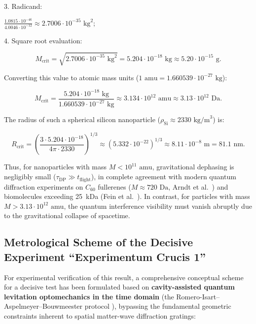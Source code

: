 3. Radicand:

   $\frac{1.0815 \cdot 10^{-46}}{4.0046 \cdot 10^{-12}} \approx 2.7006 \cdot 10^{-35}\text{ kg}^2$;

4. Square root evaluation:

\begin{equation}\label{eq:5.43}\tag{5.43}
M_{\text{crit}} = \sqrt{2.7006 \cdot 10^{-35}\text{ kg}^2} = 5.204 \cdot 10^{-18}\text{ kg} \approx 5.20 \cdot 10^{-15}\text{ g}.
\end{equation}

Converting this value to atomic mass units ($1\text{ amu} = 1.660539 \cdot 10^{-27}\text{ kg}$):

\begin{equation}\label{eq:5.44}\tag{5.44}
M_{\text{crit}} = \frac{5.204 \cdot 10^{-18}\text{ kg}}{1.660539 \cdot 10^{-27}\text{ kg}} \approx 3.134 \cdot 10^{12}\text{ amu} \approx 3.13 \cdot 10^{12}\text{ Da}.
\end{equation}

The radius of such a spherical silicon nanoparticle ($\rho_{\text{Si}} \approx 2330\text{ kg/m}^3$) is:

\begin{equation}\label{eq:5.45}\tag{5.45}
R_{\text{crit}} = \left( \frac{3 \cdot 5.204 \cdot 10^{-18}}{4\pi \cdot 2330} \right)^{1/3} \approx (5.332 \cdot 10^{-22})^{1/3} \approx 8.11 \cdot 10^{-8}\text{ m} = 81.1\text{ nm}.
\end{equation}

Thus, for nanoparticles with mass $M < 10^{11}\text{ amu}$, gravitational dephasing is negligibly small ($\tau_{\text{DP}} \gg t_{\text{flight}}$), in complete agreement with modern quantum diffraction experiments on $C_{60}$ fullerenes ($M \approx 720\text{ Da}$, Arndt et al.~\cite{ref42}) and biomolecules exceeding 25~kDa (Fein et al.~\cite{ref43}). In contrast, for particles with mass $M > 3.13 \cdot 10^{12}\text{ amu}$, the quantum interference visibility must vanish abruptly due to the gravitational collapse of spacetime.

\subsection{Metrological Scheme of the Decisive Experiment ``Experimentum Crucis 1''}\label{sec:5.3}

For experimental verification of this result, a comprehensive conceptual scheme for a decisive test has been formulated based on \textbf{cavity-assisted quantum levitation optomechanics in the time domain} (the Romero-Isart--Aspelmeyer--Bouwmeester protocol \cite{ref40,ref41,ref42}), bypassing the fundamental geometric constraints inherent to spatial matter-wave diffraction gratings:


